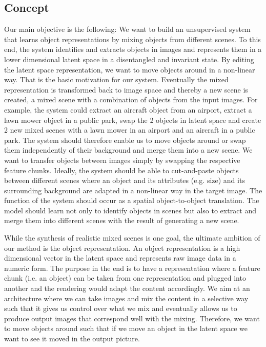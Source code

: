 \documentclass[12pt,a4paper]{article}
\begin{document}
\subsection{Concept}\label{subsec:concept}
Our main objective is the following: We want to build an unsupervised system that learns object representations by mixing objects from different scenes. To this end, the system identifies and extracts objects in images and represents them in a lower dimensional latent space in a disentangled and invariant state. By editing the latent space representation, we want to move objects around in a non-linear way. That is the basic motivation for our system. Eventually the mixed representation is transformed back to image space and thereby a new scene is created, a mixed scene with a combination of objects from the input images. For example, the system could extract an aircraft object from an airport, extract a lawn mower object in a public park, swap the 2 objects in latent space and create 2 new mixed scenes with a lawn mower in an airport and an aircraft in a public park. 
The system should therefore enable us to move objects around or swap them independently of their background and merge them into a new scene. We want to transfer objects between images simply by swapping the respective feature chunks. Ideally, the system should be able to cut-and-paste objects between different scenes where an object and its attributes (e.g. size) and its surrounding background are adapted in a non-linear way in the target image. The function of the system should occur as a spatial object-to-object translation. The model should learn not only to identify objects in scenes but also to extract and merge them into different scenes with the result of generating a new scene. 

While the synthesis of realistic mixed scenes is one goal, the ultimate ambition of our method is the object representation. An object representation is a high dimensional vector in the latent space and represents raw image data in a numeric form. The purpose in the end is to have a representation where a feature chunk (i.e. an object) can be taken from one representation and plugged into another and the rendering would adapt the content accordingly. We aim at an architecture where we can take images and mix the content in a selective way such that it gives us control over what we mix and eventually allows us to produce output images that correspond well with the mixing. Therefore, we want to move objects around such that if we move an object in the latent space we want to see it moved in the output picture. 
\end{document}
